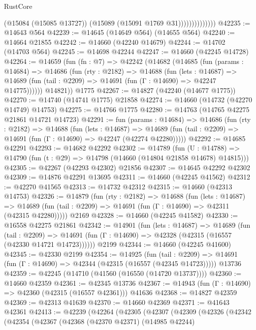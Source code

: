 \begin{lexlean}{RustCore}
\begin{coremodule}
                            (@15084 (@15085 @13727))
                            (@15089 (@15091 @1769 @31))))))))))))))
@42235 := @14643 @564
@42239 := @14645 (@14649 @564) (@14655 @564)
@42240 := @14664 @21855
@42242 := @14660 (@42240 @14679)
@42244 := @14702 (@14703 @564)
@42245 := @14698 @42244
@42247 := @14660 (@42245 @14728)
@42264 := @14659
    (fun (fn : @7) =>
    @42242
      (@14682
        (@14685
          (fun (params : @14684) =>
          @14686
            (fun (rty : @2182) =>
            @14688
              (fun (lets : @14687) =>
              @14689 (fun (tail : @2209) => @14691 (fun (Γ : @14690) => @42247 @14775))))))
        @14821))
    @1775
@42267 := @14827 (@42240 (@14677 @1775))
@42270 := @14740 (@14741 @1775) @21858
@42274 := @14660 (@14732 (@42270 @14749) @14753)
@42275 := @14766 @1775
@42280 := @14763 (@14765 @42275 @21861 @14721 @14723)
@42291 := fun (params : @14684) =>
  @14686
    (fun (rty : @2182) =>
    @14688
      (fun (lets : @14687) =>
      @14689 (fun (tail : @2209) => @14691 (fun (Γ : @14690) => @42247 (@42274 @42280)))))
@42292 := @14685 @42291
@42293 := @14682 @42292
@42302 := @14789
    (fun (U : @14788) => @14790 (fun (t : @29) => @14798 (@14660 (@14804 @21858 @14678) @14815)))
@42305 := @42267 (@42293 @42302) @21856
@42307 := @14645 @42292 @42302
@42309 := @14876 @42291 @13695
@42311 := @14660 (@42245 @41562)
@42312 := @42270 @41565
@42313 := @14732 @42312
@42315 := @14660 (@42313 @14753)
@42326 := @14879
    (fun (rty : @2182) =>
    @14688
      (fun (lets : @14687) =>
      @14689 (fun (tail : @2209) => @14691 (fun (Γ : @14690) => @42311 (@42315 @42280)))))
    @2169
@42328 := @14660 (@42245 @41582)
@42330 := @16558 @42275 @21861
@42342 := @14901
    (fun (lets : @14687) =>
    @14689
      (fun (tail : @2209) =>
      @14691 (fun (Γ : @14690) => @42328 (@42315 (@16557 (@42330 @14721 @14723))))))
    @2199
@42344 := @14660 (@42245 @41600)
@42345 := @42330 @2199
@42354 := @14925
    (fun (tail : @2209) => @14691 (fun (Γ : @14690) => @42344 (@42315 (@16557 (@42345 @14723)))))
    @13736
@42359 := @42245 (@14710 (@41560 (@16550 (@14720 @13737))))
@42360 := @14660 @42359
@42361 := @42345 @13736
@42367 := @14943 (fun (Γ : @14690) => @42360 (@42315 (@16557 @42361))) @41636
@42368 := @14827 @42359
@42369 := @42313 @41639
@42370 := @14660 @42369
@42371 := @41643 @42361
@42413 := @42239
    (@42264
      (@42305
        (@42307
          (@42309
            (@42326
              (@42342
                (@42354
                  (@42367
                    (@42368
                      (@42370 @42371)
                      (@14985 @42244)

\end{coremodule}
\end{lexlean}
